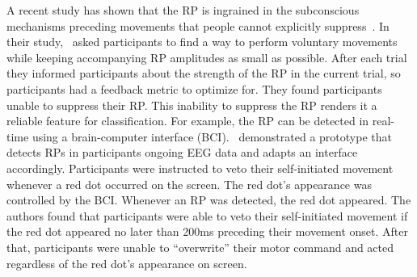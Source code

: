 A recent study has shown that the RP is ingrained in the subconscious mechanisms preceding movements that people cannot explicitly suppress~\cite{Schultze-Kraft2021-cu}. In their study,~\citet{Schultze-Kraft2021-cu} asked participants to find a way to perform voluntary movements while keeping accompanying RP amplitudes as small as possible. After each trial they informed participants about the strength of the RP in the current trial, so participants had a feedback metric to optimize for. They found participants unable to suppress their RP. This inability to suppress the RP renders it a reliable feature for classification. For example, the RP can be detected in real-time using a brain-computer interface (BCI).~\citet{Schultze-Kraft2016-bx} demonstrated a prototype that detects RPs in participants ongoing EEG data and adapts an interface accordingly. Participants were instructed to veto their self-initiated movement whenever a red dot occurred on the screen. The red dot's appearance was controlled by the BCI. Whenever an RP was detected, the red dot appeared. The authors found that participants were able to veto their self-initiated movement if the red dot appeared no later than 200ms preceding their movement onset. After that, participants were unable to ``overwrite'' their motor command and acted regardless of the red dot's appearance on screen.


